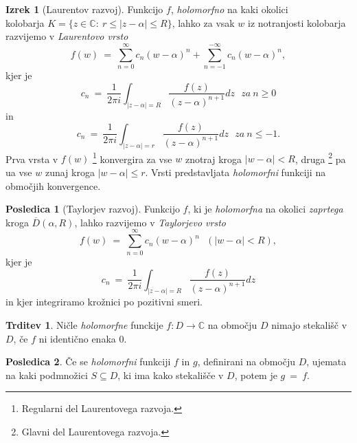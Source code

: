 \documentclass[11pt]{article}
\theoremstyle{definition}
\theoremstyle{definition}
\newtheorem{trditev}{Trditev}[section]
\theoremstyle{definition}
\newtheorem{izrek}{Izrek}[section]
\newtheorem*{posledica}{Posledica}
\begin{document}
\begin{izrek}[Laurentov razvoj]

Funkcijo $f$, \textit{holomorfno} na kaki okolici \\kolobarja $K = \{ z \in \mathbb{C}: ~r \leq |z - \alpha| \leq R \}$, lahko za vsak $w$ iz notranjosti kolobarja razvijemo v \textit{Laurentovo vrsto}
$$f(w) ~=~ \sum_{n=0}^{\infty} c_n (w - \alpha)^n + \sum_{n=-1}^{-\infty} c_n (w - \alpha)^n,$$
kjer je 
$$c_n ~=~ \frac{1}{2 \pi i} \int_{|z - \alpha| = R} \frac{f(z)}{(z - \alpha)^{n+1}} dz ~~~\textit{za}~ n \geq 0$$
in
$$c_n ~=~ \frac{1}{2 \pi i} \int_{|z - \alpha| = r} \frac{f(z)}{(z - \alpha)^{n+1}} dz ~~~\textit{za}~ n \leq -1.$$
Prva vrsta v $f(w)$ \footnote{Regularni del Laurentovega razvoja.} konvergira za vse $w$ znotraj kroga $|w - \alpha| < R$, druga \footnote{Glavni del Laurentovega razvoja.} pa ua vse $w$ zunaj kroga $|w - \alpha| \leq r$. Vrsti predstavljata \textit{holomorfni} funkciji na območjih konvergence.

\end{izrek}
\vspace{0.5cm}

\begin{posledica}[Taylorjev razvoj]

Funkcijo $f$, ki je \textit{holomorfna} na okolici \textit{zaprtega} kroga $\overline{D}(\alpha, R)$, lahko razvijemo v \textit{Taylorjevo vrsto}
$$f(w) ~=~ \sum_{n=0}^{\infty} c_n (w - \alpha)^n ~~~(|w - \alpha| < R),$$
kjer je 
$$c_n ~=~ \frac{1}{2 \pi i} \int_{|z - \alpha| = R} \frac{f(z)}{(z - \alpha)^{n+1}} dz$$
in kjer integriramo krožnici po pozitivni smeri.

\end{posledica}
\vspace{0.5cm}

\begin{trditev}

Ničle \textit{holomorfne} funckije $f: D \rightarrow \mathbb{C}$ na območju $D$ nimajo stekališč v $D$, če $f$ ni identično enaka $0$.

\end{trditev}
\vspace{0.5cm}

\begin{posledica}

Če se \textit{holomorfni} funkciji $f$ in $g$, definirani na območju $D$, ujemata na kaki podmnožici $S \subseteq D$, ki ima kako stekališče v $D$, potem je $g ~=~ f$.  

\end{posledica}
\vspace{0.5cm}
\end{document}
